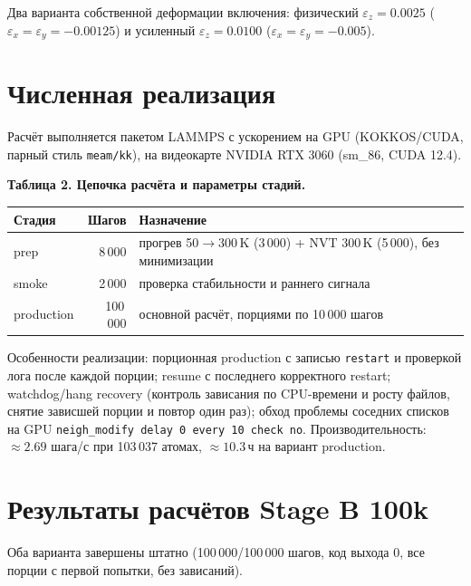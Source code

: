 \documentclass[14pt,a4paper]{extarticle}
\newcommand{\code}[1]{\texttt{#1}}
\newcommand{\tabcap}[1]{\par\smallskip\noindent\textbf{#1}\par\smallskip}
\begin{document}
Два варианта собственной деформации включения: физический $\varepsilon_z = 0.0025$ ($\varepsilon_x = \varepsilon_y = -0.00125$) и усиленный $\varepsilon_z = 0.0100$ ($\varepsilon_x = \varepsilon_y = -0.005$).

\section{Численная реализация}
Расчёт выполняется пакетом LAMMPS с ускорением на GPU (KOKKOS/CUDA, парный стиль \code{meam/kk}), на видеокарте NVIDIA RTX 3060 (sm\_86, CUDA 12.4).

\tabcap{Таблица 2. Цепочка расчёта и параметры стадий.}
\begin{longtable}{p{} r p{}}
\toprule
Стадия & Шагов & Назначение \\
\midrule
\endhead
prep & 8\,000 & прогрев 50$\to$300\,K (3\,000) + NVT 300\,K (5\,000), без минимизации \\
smoke & 2\,000 & проверка стабильности и раннего сигнала \\
production & 100\,000 & основной расчёт, порциями по 10\,000 шагов \\
\bottomrule
\end{longtable}

Особенности реализации: порционная production с записью \code{restart} и проверкой лога после каждой порции; resume с последнего корректного restart; watchdog/hang recovery (контроль зависания по CPU-времени и росту файлов, снятие зависшей порции и повтор один раз); обход проблемы соседних списков на GPU \code{neigh\_modify delay 0 every 10 check no}. Производительность: $\approx 2.69$ шага/с при 103\,037 атомах, $\approx 10.3$\,ч на вариант production.

\section{Результаты расчётов Stage B 100k}
Оба варианта завершены штатно (100\,000/100\,000 шагов, код выхода 0, все порции с первой попытки, без зависаний).
\end{document}
